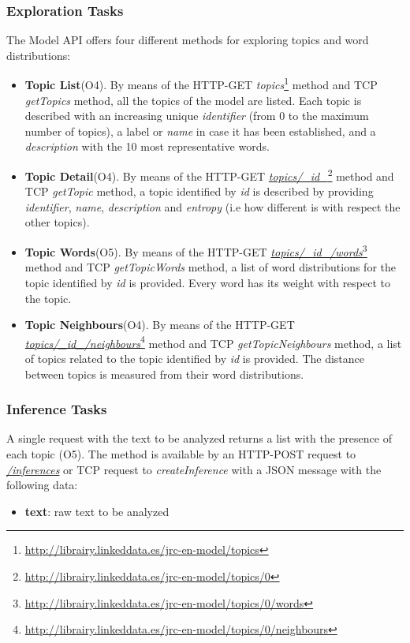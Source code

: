\subsubsection{Exploration Tasks}
The Model API offers four different methods for exploring topics and word distributions: 

\begin{itemize}
\item \textbf{Topic List}(O4). By means of the HTTP-GET \textit{topics}\footnote{\url{http://librairy.linkeddata.es/jrc-en-model/topics}} method and TCP \textit{getTopics} method, all the topics of the model are listed. Each topic is described with an increasing unique \textit{identifier} (from 0 to the maximum number of topics), a label or \textit{name} in case it has been established, and a \textit{description} with the 10 most representative words. 
\item \textbf{Topic Detail}(O4). By means of the HTTP-GET \textit{\url{topics/_id_}}\footnote{\url{http://librairy.linkeddata.es/jrc-en-model/topics/0}} method and TCP \textit{getTopic} method, a topic identified by \textit{id} is described by providing \textit{identifier}, \textit{name}, \textit{description} and \textit{entropy} (i.e how different is with respect the other topics).
\item \textbf{Topic Words}(O5). By means of the HTTP-GET \textit{\url{topics/_id_/words}}\footnote{\url{http://librairy.linkeddata.es/jrc-en-model/topics/0/words}} method and TCP \textit{getTopicWords} method, a list of word distributions for the topic identified by \textit{id} is provided. Every word has its weight with respect to the topic.
\item \textbf{Topic Neighbours}(O4). By means of the HTTP-GET \textit{\url{topics/_id_/neighbours}}\footnote{\url{http://librairy.linkeddata.es/jrc-en-model/topics/0/neighbours}} method and TCP \textit{getTopicNeighbours} method, a list of topics related to the topic identified by \textit{id} is provided. The distance between topics is measured from their word distributions.  
\end{itemize}

\subsubsection{Inference Tasks}

A single request with the text to be analyzed returns a list with the presence of each topic (O5). The method is available by an HTTP-POST request to \textit{\url{/inferences}} or  TCP request to \textit{createInference} with a JSON message with the following data:
\begin{itemize}
\item \textbf{text}: raw text to be analyzed
\end{itemize} 

